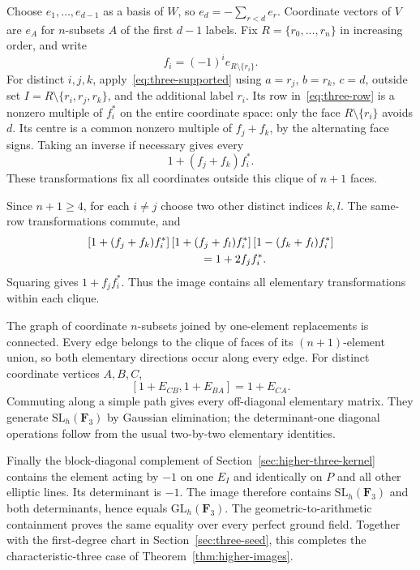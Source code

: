 Choose $e_1,\ldots,e_{d-1}$ as a basis of $W$, so $e_d=-\sum_{r<d}e_r$. Coordinate vectors of $V$ are $e_A$ for $n$-subsets $A$ of the first $d-1$ labels. Fix $R=\{r_0,\ldots,r_n\}$ in increasing order, and write
\[
f_i=(-1)^i e_{R\setminus\{r_i\}}.
\]
For distinct $i,j,k$, apply~\eqref{eq:three-supported} using $a=r_j$, $b=r_k$, $c=d$, outside set $I=R\setminus\{r_i,r_j,r_k\}$, and the additional label $r_i$. Its row in~\eqref{eq:three-row} is a nonzero multiple of $f_i^*$ on the entire coordinate space: only the face $R\setminus\{r_i\}$ avoids $d$. Its centre is a common nonzero multiple of $f_j+f_k$, by the alternating face signs. Taking an inverse if necessary gives every
\begin{equation}\label{eq:three-triple}
1+(f_j+f_k)f_i^*.
\end{equation}
These transformations fix all coordinates outside this clique of $n+1$ faces.

Since $n+1\ge4$, for each $i\ne j$ choose two other distinct indices $k,l$. The same-row transformations commute, and
\begin{align*}
&[1+(f_j+f_k)f_i^*]\,[1+(f_j+f_l)f_i^*]\,[1-(f_k+f_l)f_i^*]\\
&\hspace{35mm}=1+2f_jf_i^*.
\end{align*}
Squaring gives $1+f_jf_i^*$. Thus the image contains all elementary transformations within each clique.

The graph of coordinate $n$-subsets joined by one-element replacements is connected. Every edge belongs to the clique of faces of its $(n+1)$-element union, so both elementary directions occur along every edge. For distinct coordinate vertices $A,B,C$,
\[
[1+E_{CB},1+E_{BA}]=1+E_{CA}.
\]
Commuting along a simple path gives every off-diagonal elementary matrix. They generate $\mathrm{SL}_h(\mathbf F_3)$ by Gaussian elimination; the determinant-one diagonal operations follow from the usual two-by-two elementary identities.

Finally the block-diagonal complement of Section~\ref{sec:higher-three-kernel} contains the element acting by $-1$ on one $E_I$ and identically on $P$ and all other elliptic lines. Its determinant is $-1$. The image therefore contains $\mathrm{SL}_h(\mathbf F_3)$ and both determinants, hence equals $\mathrm{GL}_h(\mathbf F_3)$. The geometric-to-arithmetic containment proves the same equality over every perfect ground field. Together with the first-degree chart in Section~\ref{sec:three-seed}, this completes the characteristic-three case of Theorem~\ref{thm:higher-images}.

